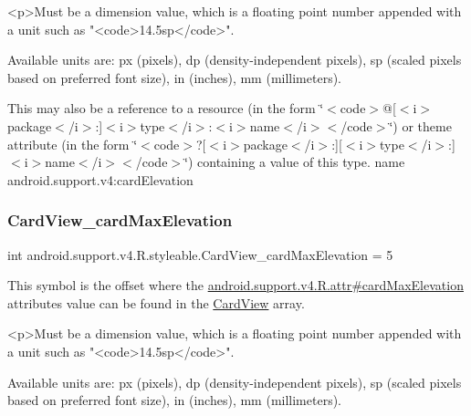 \begin{DoxyVerb}      <p>Must be a dimension value, which is a floating point number appended with a unit such as "<code>14.5sp</code>".
\end{DoxyVerb}
 Available units are\+: px (pixels), dp (density-\/independent pixels), sp (scaled pixels based on preferred font size), in (inches), mm (millimeters). 

This may also be a reference to a resource (in the form \char`\"{}$<$code$>$@\mbox{[}$<$i$>$package$<$/i$>$\+:\mbox{]}$<$i$>$type$<$/i$>$\+:$<$i$>$name$<$/i$>$$<$/code$>$\char`\"{}) or theme attribute (in the form \char`\"{}$<$code$>$?\mbox{[}$<$i$>$package$<$/i$>$\+:\mbox{]}\mbox{[}$<$i$>$type$<$/i$>$\+:\mbox{]}$<$i$>$name$<$/i$>$$<$/code$>$\char`\"{}) containing a value of this type.  name android.\+support.\+v4\+:card\+Elevation \mbox{\label{classandroid_1_1support_1_1v4_1_1R_1_1styleable_a1f0c57b668e80289ddb732e9a4fe86a7}} 
\subsubsection{\texorpdfstring{Card\+View\+\_\+card\+Max\+Elevation}{CardView\_cardMaxElevation}}
{\footnotesize\ttfamily int android.\+support.\+v4.\+R.\+styleable.\+Card\+View\+\_\+card\+Max\+Elevation = 5\hspace{0.3cm}{\ttfamily [static]}}

This symbol is the offset where the \hyperlink{classandroid_1_1support_1_1v4_1_1R_1_1attr_ad18cbbc644b56d8fbbc0f10f5ddba48a}{android.\+support.\+v4.\+R.\+attr\#card\+Max\+Elevation} attribute\textquotesingle{}s value can be found in the \hyperlink{classandroid_1_1support_1_1v4_1_1R_1_1styleable_a0e520cd4c78beb0d456e4018c4ba0e86}{Card\+View} array.

\begin{DoxyVerb}      <p>Must be a dimension value, which is a floating point number appended with a unit such as "<code>14.5sp</code>".
\end{DoxyVerb}
 Available units are\+: px (pixels), dp (density-\/independent pixels), sp (scaled pixels based on preferred font size), in (inches), mm (millimeters). 


